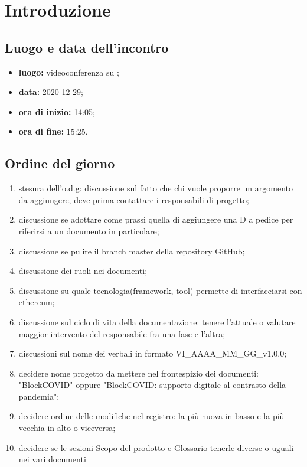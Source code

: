 \section*{Introduzione}

\subsection*{Luogo e data dell'incontro}
\begin{itemize}
	\item \textbf{luogo:} videoconferenza su ;
	\item \textbf{data:} 2020-12-29;
	\item \textbf{ora di inizio:} 14:05;
	\item \textbf{ora di fine:} 15:25.
\end{itemize}

\subsection*{Ordine del giorno}
	\begin{enumerate}
	\item stesura dell'o.d.g: discussione sul fatto che chi vuole proporre un argomento da aggiungere, deve prima contattare i responsabili di progetto;
	\item discussione se adottare come prassi quella di aggiungere una D a pedice per riferirsi a un documento in particolare;
	\item discussione se pulire il branch master della repository GitHub;
	\item discussione dei ruoli nei documenti;
	\item discussione su quale tecnologia(framework, tool) permette di interfacciarsi con ethereum;
	\item discussione sul ciclo di vita della documentazione: tenere l'attuale o valutare maggior intervento del responsabile fra una fase e l'altra;
	\item discussioni sul nome dei verbali in formato VI\_AAAA\_MM\_GG\_v1.0.0;
	\item decidere nome progetto da mettere nel frontespizio dei documenti: "BlockCOVID" oppure "BlockCOVID: supporto digitale al contrasto della pandemia";
	\item decidere ordine delle modifiche nel registro: la più nuova in basso e la più vecchia in alto o viceversa;
	\item decidere se le sezioni Scopo del prodotto e Glossario tenerle diverse o uguali nei vari documenti

\end{enumerate}

